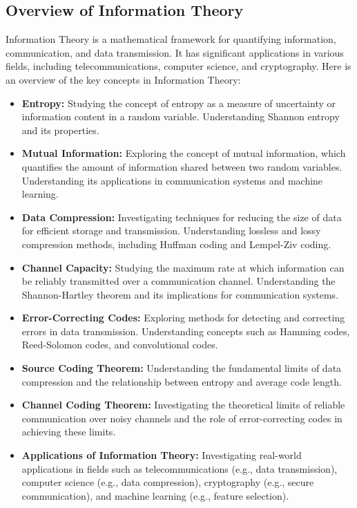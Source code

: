 \documentclass[openany]{book}
\begin{document}
\subsection{Overview of Information Theory}
Information Theory is a mathematical framework for quantifying information, communication, and data transmission. It has significant applications in various fields, including telecommunications, computer science, and cryptography. Here is an overview of the key concepts in Information Theory:
\begin{itemize}
    \item \textbf{Entropy:} Studying the concept of entropy as a measure of uncertainty or information content in a random variable. Understanding Shannon entropy and its properties.
    \item \textbf{Mutual Information:} Exploring the concept of mutual information, which quantifies the amount of information shared between two random variables. Understanding its applications in communication systems and machine learning.
    \item \textbf{Data Compression:} Investigating techniques for reducing the size of data for efficient storage and transmission. Understanding lossless and lossy compression methods, including Huffman coding and Lempel-Ziv coding.
    \item \textbf{Channel Capacity:} Studying the maximum rate at which information can be reliably transmitted over a communication channel. Understanding the Shannon-Hartley theorem and its implications for communication systems.
    \item \textbf{Error-Correcting Codes:} Exploring methods for detecting and correcting errors in data transmission. Understanding concepts such as Hamming codes, Reed-Solomon codes, and convolutional codes.
    \item \textbf{Source Coding Theorem:} Understanding the fundamental limits of data compression and the relationship between entropy and average code length.
    \item \textbf{Channel Coding Theorem:} Investigating the theoretical limits of reliable communication over noisy channels and the role of error-correcting codes in achieving these limits.
    \item \textbf{Applications of Information Theory:} Investigating real-world applications in fields such as telecommunications (e.g., data transmission), computer science (e.g., data compression), cryptography (e.g., secure communication), and machine learning (e.g., feature selection).

\end{itemize}
\end{document}
